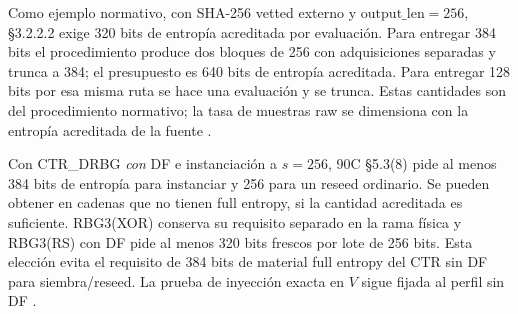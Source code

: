 \documentclass[11pt,a4paper]{article}
\begin{document}
Como ejemplo normativo, con SHA-256 vetted externo y
\(\mathrm{output\_len}=256\), §3.2.2.2 exige 320 bits de
entropía acreditada por evaluación. Para entregar 384 bits
el procedimiento produce dos bloques de 256 con adquisiciones
separadas y trunca a 384; el presupuesto es 640 bits de
entropía acreditada. Para entregar 128 bits por esa misma
ruta se hace una evaluación y se trunca. Estas cantidades
son del procedimiento normativo; la tasa de muestras raw
se dimensiona con la entropía acreditada de la fuente
\cite[§§3.1, 3.2.1.2 y 3.2.2.2]{nist90c}.

Con CTR\_DRBG \emph{con} DF e instanciación a \(s=256\),
90C §5.3(8) pide al menos 384 bits de entropía para instanciar
y 256 para un reseed ordinario. Se pueden obtener en cadenas
que no tienen full entropy, si la cantidad acreditada es suficiente.
RBG3(XOR) conserva su requisito separado en la rama física y
RBG3(RS) con DF pide al menos 320 bits frescos por lote de
256 bits. Esta elección evita el requisito de 384 bits de
material full entropy del CTR sin DF para siembra/reseed.
La prueba de inyección exacta en \(V\) sigue fijada al perfil sin DF
\cite[§§5.3(7)--(8), 6.3(5)--(6), 6.4.2 y 6.5.1.2]{nist90c}.
\end{document}
